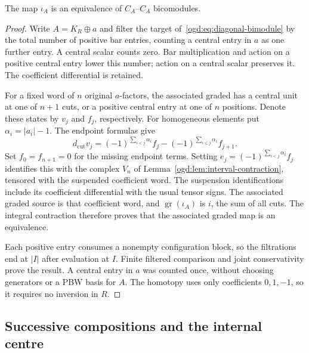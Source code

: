 \begin{proposition}\label{ogd:prop:diagonal-bimodule}
The map \(\iota_A\) is an equivalence of \(C_A\)--\(C_A\) bicomodules.
\end{proposition}
\begin{proof}
Write \(A=K_R\oplus a\) and filter the target of~\eqref{ogd:eq:diagonal-bimodule} by the total number of positive bar entries, counting a central entry in \(a\) as one further entry.
A central scalar counts zero.
Bar multiplication and action on a positive central entry lower this number; action on a central scalar preserves it.
The coefficient differential is retained.

For a fixed word of \(n\) original \(a\)-factors, the associated graded has a central unit at one of \(n+1\) cuts, or a positive central entry at one of \(n\) positions.
Denote these states by \(v_j\) and \(f_j\), respectively.
For homogeneous elements put \(\alpha_i=|a_i|-1\).
The endpoint formulas give
\[
 d_{\mathrm{cut}}v_j
 =(-1)^{\sum_{i<j}\alpha_i}f_j
   -(-1)^{\sum_{i\leq j}\alpha_i}f_{j+1}.
\]
Set \(f_0=f_{n+1}=0\) for the missing endpoint terms.
Setting \(e_j=(-1)^{\sum_{i<j}\alpha_i}f_j\) identifies this with the complex \(V_n\) of Lemma~\ref{ogd:lem:interval-contraction}, tensored with the suspended coefficient word.
The suspension identifications include its coefficient differential with the usual tensor signs.
The associated graded source is that coefficient word, and \(\operatorname{gr}(\iota_A)\) is \(i\), the sum of all cuts.
The integral contraction therefore proves that the associated graded map is an equivalence.

Each positive entry consumes a nonempty configuration block, so the filtrations end at \(|I|\) after evaluation at \(I\).
Finite filtered comparison and joint conservativity prove the result.
A central entry in \(a\) was counted once, without choosing generators or a PBW basis for \(A\).
The homotopy uses only coefficients \(0,1,-1\), so it requires no inversion in \(R\).
\end{proof}

\subsection{Successive compositions and the internal centre}

